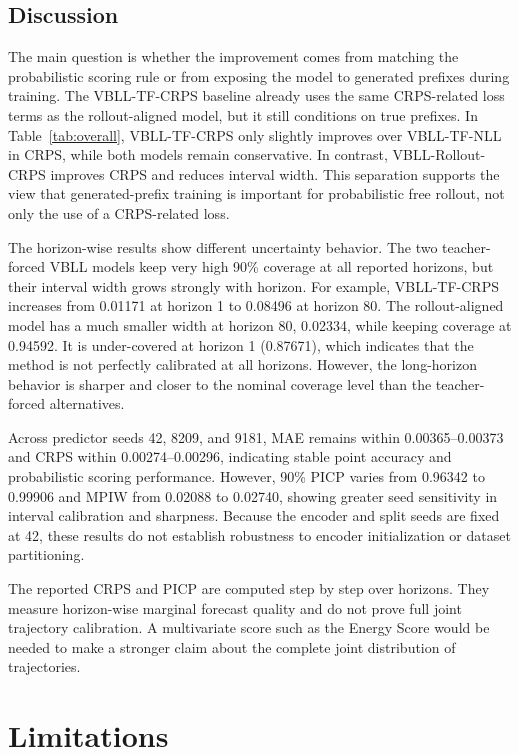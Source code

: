 \documentclass[conference]{IEEEtran}
\begin{document}
\subsection{Discussion}

The main question is whether the improvement comes from matching the
probabilistic scoring rule or from exposing the model to generated prefixes
during training. The VBLL-TF-CRPS baseline already uses the same CRPS-related
loss terms as the rollout-aligned model, but it still conditions on true
prefixes. In Table~\ref{tab:overall}, VBLL-TF-CRPS only slightly improves over
VBLL-TF-NLL in CRPS, while both models remain conservative. In contrast,
VBLL-Rollout-CRPS improves CRPS and reduces interval width. This separation
supports the view that generated-prefix training is important for
probabilistic free rollout, not only the use of a CRPS-related loss.

The horizon-wise results show different uncertainty behavior. The two
teacher-forced VBLL models keep very high 90\% coverage at all reported
horizons, but their interval width grows strongly with horizon. For example,
VBLL-TF-CRPS increases from 0.01171 at horizon 1 to 0.08496 at horizon 80.
The rollout-aligned model has a much smaller width at horizon 80, 0.02334,
while keeping coverage at 0.94592. It is under-covered at horizon 1
(0.87671), which indicates that the method is not perfectly calibrated at all
horizons. However, the long-horizon behavior is sharper and closer to the
nominal coverage level than the teacher-forced alternatives.

Across predictor seeds 42, 8209, and 9181, MAE remains within
0.00365--0.00373 and CRPS within 0.00274--0.00296, indicating stable point
accuracy and probabilistic scoring performance. However, 90\% PICP varies from
0.96342 to 0.99906 and MPIW from 0.02088 to 0.02740, showing greater seed
sensitivity in interval calibration and sharpness. Because the encoder and
split seeds are fixed at 42, these results do not establish robustness to
encoder initialization or dataset partitioning.

The reported CRPS and PICP are computed step by step over horizons. They
measure horizon-wise marginal forecast quality and do not prove full joint
trajectory calibration. A multivariate score such as the Energy Score would be
needed to make a stronger claim about the complete joint distribution of
trajectories.

\section{Limitations}
\end{document}
